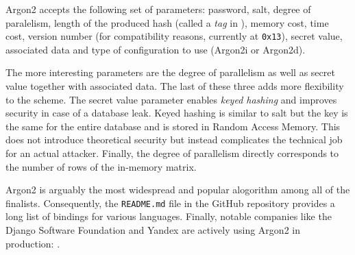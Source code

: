 Argon2 accepts the following set of parameters: password, salt, degree of paralelism, length of the produced hash (called a \emph{tag} in \cite{biryukov:2015:argon2}), memory cost, time cost, version number (for compatibility reasons, currently at \texttt{0x13}), secret value, associated data and type of configuration to use (Argon2i or Argon2d).

The more interesting parameters are the degree of parallelism as well as secret value together with associated data. The last of these three adds more flexibility to the scheme. The secret value parameter enables \emph{keyed hashing} and improves security in case of a database leak. Keyed hashing is similar to salt but the key is the same for the entire database and is stored in Random Access Memory. This does not introduce theoretical security but instead complicates the technical job for an actual attacker. Finally, the degree of parallelism directly corresponds to the number of rows of the in-memory matrix.

Argon2 is arguably the most widespread and popular alogorithm among all of the finalists. Consequently, the \texttt{README.md} file in the GitHub repository \cite{github:2017:argon2} provides a long list of bindings for various languages. Finally, notable companies like the Django Software Foundation and Yandex are actively using Argon2 in production: \cite{django:2017:argon2, github:2017:argonische}.
